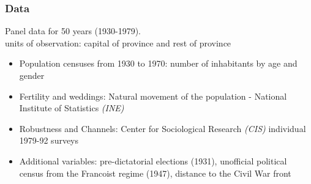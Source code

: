 \documentclass[aspectratio=169]{beamer}
\begin{document}
\begin{frame}[label=databack]
 \frametitle{Data }

Panel data for 50 years (1930-1979).
\\
 units of observation: capital of province and rest of province

\medskip
\begin{itemize}


\footnotesize
\item {\color{blue}Population} censuses from 1930 to 1970: number of inhabitants by age and gender
\medskip
\item {\color{blue}Fertility and weddings}: Natural movement of the population - National  Institute of Statistics \textit{(INE)}  %
\medskip



\item {\color{blue}Robustness and Channels:} Center for Sociological Research \textit{(CIS)} individual 1979-92 surveys
\medskip


\item {\color{blue}Additional variables:} pre-dictatorial elections (1931), unofficial political census from the Francoist regime (1947), distance to the Civil War front
\end{itemize}

\end{frame}
\end{document}
